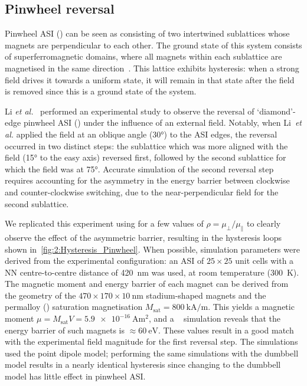 \subsection{Pinwheel reversal}\label{sec:2:Applications_reversal_Pinwheel}
Pinwheel ASI () can be seen as consisting of two intertwined sublattices whose magnets are perpendicular to each other.
The ground state of this system consists of superferromagnetic domains, where all magnets within each sublattice are magnetised in the same direction~\cite{EmergentChiralityRatchet,ApparentFMpinwheel,RC_ASI}.
This lattice exhibits hysteresis: when a strong field drives it towards a uniform state, it will remain in that state after the field is removed since this is a ground state of the system. \par
Li \textit{et al.}~\cite{li2018pinwheel} performed an experimental study to observe the reversal of `diamond'-edge pinwheel ASI () under the influence of an external field.
Notably, when Li~\textit{et al.} applied the field at an oblique angle (\ang{30}) to the ASI edges, the reversal occurred in two distinct steps: the sublattice which was more aligned with the field (\ang{15} to the easy axis) reversed first, followed by the second sublattice for which the field was at \ang{75}.
Accurate simulation of the second reversal step requires accounting for the asymmetry in the energy barrier between clockwise and counter-clockwise switching, due to the near-perpendicular field for the second sublattice. \par
We replicated this experiment using \hotspice for a few values of $\rho=\mu_\perp/\mu_\parallel$ to clearly observe the effect of the asymmetric barrier, resulting in the hysteresis loops shown in~\cref{fig:2:Hysteresis_Pinwheel}.
When possible, simulation parameters were derived from the experimental configuration: an ASI of $25 \times 25$ unit cells with a NN centre-to-centre distance of \qty{420}{\nano\meter} was used, at room temperature (\qty{300}{\kelvin}).
The magnetic moment and energy barrier of each magnet can be derived from the geometry of the $470\times170\times\qty{10}{\nano\meter}$ stadium-shaped magnets and the permalloy () saturation magnetisation $M_\mathrm{sat}=\qty{800}{\kilo\ampere\per\meter}$.
This yields a magnetic moment $\mu = M_\mathrm{sat} V = \qty{5.9e-16}{\ampere\meter\squared}$, and a \mumax~\cite{mumax3} simulation reveals that the energy barrier of such magnets is $\approx \qty{60}{\electronvolt}$.
These values result in a good match with the experimental field magnitude for the first reversal step.
The simulations used the point dipole model; performing the same simulations with the dumbbell model results in a nearly identical hysteresis since changing to the dumbbell model has little effect in pinwheel ASI.


